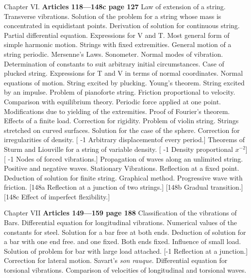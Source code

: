 Chapter VI. \textbf{Articles 118—148c page 127}
Law of extension of a string. Transverse vibrations. Solution of the problem
for a string whose mass is concentrated in equidistant points. Derivation of
solution for continuous string. Partial differential equation.  Expressions for
V and T. Most general form of simple harmonic motion. Strings with fixed
extremities. General motion of a string periodic. Mersenne’s Laws.  Sonometer.
Normal modes of vibration.  Determination of constants to suit arbitrary
initial circumstances. Case of plucked string. Expressions for T and V in terms
of normal coordinates.  Normal equations of motion. String excited by
plucking.  Young’s theorem. String excited by an impulse. Problem of pianoforte
string.  Friction proportional to velocity. Comparison with equilibrium theory.
Periodic force applied at one point. Modifications due to yielding of the
extremities. Proof of Fourier’s theorem. Effects of a finite load. Correction
for rigidity. Problem of violin string.  Strings stretched on curved surfaces.
Solution for the case of the sphere. Correction for irregularities of density.
[ -1 Arbitrary displacementof every period.]
Theorems of Sturm and Liouville for a string of variable density.
[ -1 Density proportional \(x^{-2}\)]
[ -1 Nodes of forced vibrations.]
Propagation
of waves along an unlimited string. Positive and negative waves. Stationary
Vibrations. Reflection at a fixed point. Deduction of solution for finite
string. Graphical method. Progressive wave with friction.
[148a Reflection at a junction of two strings.]
[148b Gradual transition.]
[148c Effect of imperfect flexibility.]

Chapter VII \textbf{Articles 149—159 page 188}
Classification of the vibrations of Bars. Differential equation for
longitudinal vibrations. Numerical values of the constants for steel. Solution
for a bar free at both ends. Deduction of solution for a bar with one end free.
and one fixed. Both ends fixed. Influence of small load.  Solution of problem
for bar with large load attached.
[-1 Reflection at a junction.]
Correction for lateral motion. Savart’s
\textit{son rauque}. Differential equation for torsional vibrations. Comparison
of velocities of longitudinal and torsional waves.

